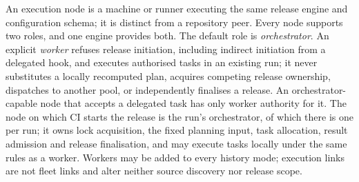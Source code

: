 \begin{definition}
\label{def:exec-roles}
An execution node is a machine or runner executing the same release engine and
configuration schema; it is distinct from a repository peer. Every node
supports two roles, and one engine provides both. The default role is
\emph{orchestrator}. An explicit \emph{worker} refuses release initiation,
including indirect initiation from a delegated hook, and executes authorised
tasks in an existing run; it never substitutes a locally recomputed plan,
acquires competing release ownership, dispatches to another pool, or
independently finalises a release. An orchestrator-capable node that accepts
a delegated task has only worker authority for it. The node on which CI starts
the release is the run's orchestrator, of which there is one per run; it owns
lock acquisition, the fixed planning input, task allocation, result admission
and release finalisation, and may execute tasks locally under the same rules
as a worker. Workers may be added to every history mode; execution links are
not fleet links and alter neither source discovery nor release scope.
\end{definition}

